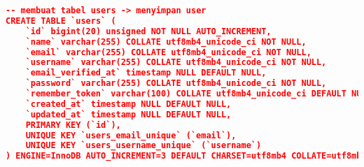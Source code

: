 \begin{lstlisting}[frame=single,tabsize=2,breaklines,caption={Basis data MySQL},label=mysql, captionpos=b, language=json]
-- membuat tabel users -> menyimpan user
CREATE TABLE `users` (
	`id` bigint(20) unsigned NOT NULL AUTO_INCREMENT,
	`name` varchar(255) COLLATE utf8mb4_unicode_ci NOT NULL,
	`email` varchar(255) COLLATE utf8mb4_unicode_ci NOT NULL,
	`username` varchar(255) COLLATE utf8mb4_unicode_ci NOT NULL,
	`email_verified_at` timestamp NULL DEFAULT NULL,
	`password` varchar(255) COLLATE utf8mb4_unicode_ci NOT NULL,
	`remember_token` varchar(100) COLLATE utf8mb4_unicode_ci DEFAULT NULL,
	`created_at` timestamp NULL DEFAULT NULL,
	`updated_at` timestamp NULL DEFAULT NULL,
	PRIMARY KEY (`id`),
	UNIQUE KEY `users_email_unique` (`email`),
	UNIQUE KEY `users_username_unique` (`username`)
) ENGINE=InnoDB AUTO_INCREMENT=3 DEFAULT CHARSET=utf8mb4 COLLATE=utf8mb4_unicode_ci;
\end{lstlisting}